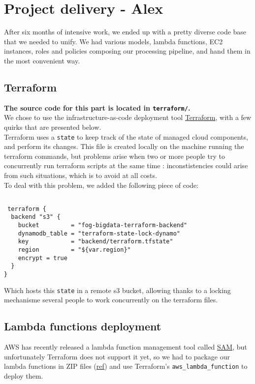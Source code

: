 \section{Project delivery - Alex}

After six months of intensive work, we ended up with a pretty diverse code base that we needed to unify. We had various models, lambda functions, EC2 instances, roles and policies composing our processing pipeline, and hand them in the most convenient way.

\subsection{Terraform}

\textbf{The source code for this part is located in \lstinline{terraform/}.}\\
We chose to use the infrastructure-as-code deployment tool \href{https://www.terraform.io/}{Terraform}, with a few quirks that are presented below. \\
Terraform uses a \lstinline{state} to keep track of the state of managed cloud components, and perform its changes. This file is created locally on the machine running the terraform commands, but problems arise when two or more people try to concurrently run terraform scripts at the same time : inconstistencies could arise from such situations, which is to avoid at all costs.\\
To deal with this problem, we added the following piece of code: 
\begin{lstlisting}

 terraform {
  backend "s3" {
    bucket         = "fog-bigdata-terraform-backend"
    dynamodb_table = "terraform-state-lock-dynamo"
    key            = "backend/terraform.tfstate"
    region         = "${var.region}"
    encrypt = true
  }
} 
\end{lstlisting}

Which hosts this \lstinline{state} in a remote s3 bucket, allowing thanks to a locking mechanisme several people to work concurrently on the terraform files.

\subsection{Lambda functions deployment}
AWS has recently released a lambda function management tool called \href{https://docs.aws.amazon.com/serverless-application-model/latest/developerguide/what-is-sam.html}{SAM}, but unfortunately Terraform does not support it yet, so we had to package our lambda functions in ZIP files (\href{https://docs.aws.amazon.com/lambda/latest/dg/lambda-python-how-to-create-deployment-package.html#python-package-dependencies}{ref}) and use Terraform's \lstinline{aws_lambda_function} to deploy them.

